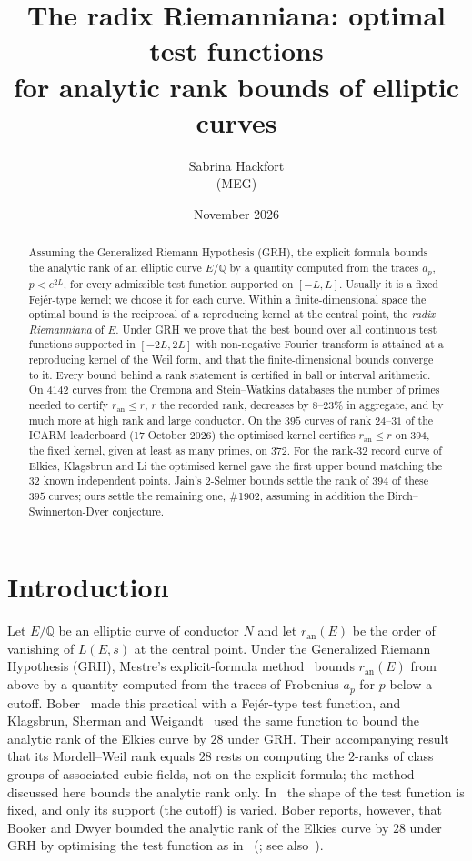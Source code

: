 \documentclass[11pt]{amsart}
\title[The radix Riemanniana]{The radix Riemanniana: optimal test functions\\ for analytic rank bounds of elliptic curves}
\author[Sabrina Hackfort]{Sabrina Hackfort\\[2pt]{\normalfont\small (MEG)}}
\date{November 2026}
\renewcommand{\S}{\ensuremath{\mathsection}}
\theoremstyle{remark}
\theoremstyle{definition}
\newcommand{\Q}{\mathbb{Q}}
\newcommand{\ran}{r_{\mathrm{an}}}
\begin{document}
\begin{abstract}
Assuming the Generalized Riemann Hypothesis (GRH), the explicit formula bounds the analytic rank of an elliptic curve $E/\Q$ by a quantity computed from the traces $a_p$, $p<e^{2L}$, for every admissible test function supported on $[-L,L]$. Usually it is a fixed Fej\'er-type kernel; we choose it for each curve. Within a finite-dimensional space the optimal bound is the reciprocal of a reproducing kernel at the central point, the \emph{radix Riemanniana} of $E$. Under GRH we prove that the best bound over all continuous test functions supported in $[-2L,2L]$ with non-negative Fourier transform is attained at a reproducing kernel of the Weil form, and that the finite-dimensional bounds converge to it. Every bound behind a rank statement is certified in ball or interval arithmetic. On $4142$ curves from the Cremona and Stein--Watkins databases the number of primes needed to certify $\ran\le r$, $r$ the recorded rank, decreases by $8$--$23\%$ in aggregate, and by much more at high rank and large conductor. On the $395$ curves of rank $24$--$31$ of the ICARM leaderboard (17 October 2026) the optimised kernel certifies $\ran\le r$ on $394$, the fixed kernel, given at least as many primes, on $372$. For the rank-$32$ record curve of Elkies, Klagsbrun and Li the optimised kernel gave the first upper bound matching the $32$ known independent points. Jain's $2$-Selmer bounds settle the rank of $394$ of these $395$ curves; ours settle the remaining one, \#1902, assuming in addition the Birch--Swinnerton-Dyer conjecture.
\end{abstract}

\maketitle

\section{Introduction}

Let $E/\Q$ be an elliptic curve of conductor $N$ and let $\ran(E)$ be the order of vanishing of $L(E,s)$ at the central point. Under the Generalized Riemann Hypothesis (GRH), Mestre's explicit-formula method~\cite{Mestre} bounds $\ran(E)$ from above by a quantity computed from the traces of Frobenius $a_p$ for $p$ below a cutoff. Bober~\cite{Bober} made this practical with a Fej\'er-type test function, and Klagsbrun, Sherman and Weigandt~\cite{KSW} used the same function to bound the analytic rank of
the Elkies curve by $28$ under GRH. Their accompanying result that its Mordell--Weil rank equals $28$
rests on computing the $2$-ranks of class groups of associated cubic fields, not on the explicit
formula; the method discussed here bounds the analytic rank only. In~\cite{Bober,KSW} the shape of the test function is fixed, and only its support (the cutoff) is varied. Bober reports, however, that Booker and Dwyer bounded the analytic rank of the Elkies curve by $28$ under GRH by optimising the test function as in~\cite[\S3]{Booker} (\cite[Remark~1.2]{Bober}; see also~\cite[footnote~21]{Watkins}).
\end{document}
